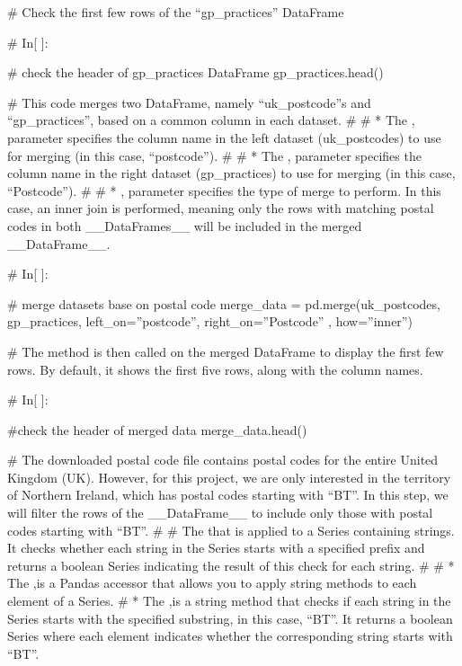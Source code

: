 \documentclass[letterpaper,10pt,english]{sphinxmanual}
\begin{document}
\sphinxAtStartPar
\# Check the first few rows of the “gp\_practices” DataFrame

\sphinxAtStartPar
\# In{[} {]}:

\sphinxAtStartPar
\# check the header of gp\_practices DataFrame
gp\_practices.head()

\sphinxAtStartPar
\# This code merges two DataFrame, namely “uk\_postcode”s and “gp\_practices”, based on a common column in each dataset.
\#
\# * The , parameter specifies the column name in the left dataset (uk\_postcodes) to use for merging (in this case, “postcode”).
\#
\# * The , parameter specifies the column name in the right dataset (gp\_practices) to use for merging (in this case, “Postcode”).
\#
\# * , parameter specifies the type of merge to perform. In this case, an inner join is performed, meaning only the rows with matching postal codes in both \_\_DataFrames\_\_ will be included in the merged \_\_DataFrame\_\_.

\sphinxAtStartPar
\# In{[} {]}:

\sphinxAtStartPar
\# merge datasets base on postal code
merge\_data = pd.merge(uk\_postcodes, gp\_practices, left\_on=”postcode”, right\_on=”Postcode” , how=”inner”)

\sphinxAtStartPar
\# The  method is then called on the merged DataFrame to display the first few rows. By default, it shows the first five rows, along with the column names.

\sphinxAtStartPar
\# In{[} {]}:

\sphinxAtStartPar
\#check the header of merged data
merge\_data.head()

\sphinxAtStartPar
\# The downloaded postal code file contains postal codes for the entire United Kingdom (UK). However, for this project, we are only interested in the territory of Northern Ireland, which has postal codes starting with “BT”. In this step, we will filter the rows of the \_\_DataFrame\_\_ to include only those with postal codes starting with “BT”.
\#
\# The  that is applied to a Series containing strings. It checks whether each string in the Series starts with a specified prefix and returns a boolean Series indicating the result of this check for each string.
\#
\# * The ,is a Pandas accessor that allows you to apply string methods to each element of a Series.
\# * The ,is a string method that checks if each string in the Series starts with the specified substring, in this case, “BT”. It returns a boolean Series where each element indicates whether the corresponding string starts with “BT”.
\end{document}

